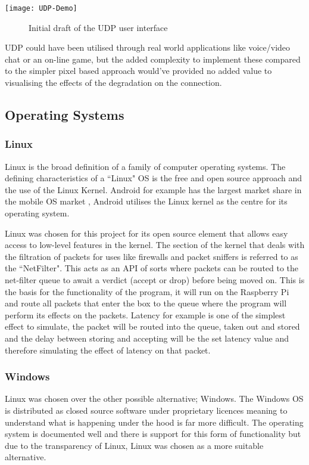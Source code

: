 \begin{center}
\texttt{[image: UDP-Demo]}
	\begin{figure}[h]
		\caption{Initial draft of the UDP user interface}
	\end{figure}
\end{center}

UDP could have been utilised through real world applications like voice/video chat or an on-line game, but the added complexity to implement these compared to the simpler pixel based approach would've provided no added value to visualising the effects of the degradation on the connection.

\subsection{Operating Systems}

\subsubsection{Linux}
Linux is the broad definition of a family of computer operating systems. The defining characteristics of a ``Linux" OS is the free and open source approach and the use of the Linux Kernel. Android for example has the largest market share in the mobile OS market \citep{share2015desktop}, Android utilises the Linux kernel as the centre for its operating system.

Linux was chosen for this project for its open source element that allows easy access to low-level features in the kernel. The section of the kernel that deals with the filtration of packets for uses like firewalls and packet sniffers is referred to as the ``NetFilter". This acts as an API of sorts where packets can be routed to the net-filter queue to await a verdict (accept or drop) before being moved on. This is the basis for the functionality of the program, it will run on the Raspberry Pi and route all packets that enter the box to the queue where the program will perform its effects on the packets. Latency for example is one of the simplest effect to simulate, the packet will be routed into the queue, taken out and stored and the delay between storing and accepting will be the set latency value and therefore simulating the effect of latency on that packet.

\subsubsection{Windows}
Linux was chosen over the other possible alternative; Windows. The Windows OS is distributed as closed source software under proprietary licences meaning to understand what is happening under the hood is far more difficult. The operating system is documented well and there is support for this form of functionality but due to the transparency of Linux, Linux was chosen as a more suitable alternative.   

